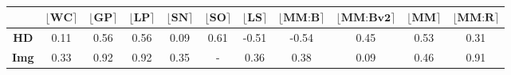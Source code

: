 \documentclass[final]{beamer}
\newlength{\colwidth}
\begin{document}
\begin{frame}[t]
\begin{columns}[t]
\begin{column}{\colwidth}
\begin{block}{\noindent{}}
\begin{table} 
\begin{subtable}{\linewidth}
\begin{tabular}{|c|c|c|c|c|c|c|c|c|c|c|}
\hline
 &                   $\lfloor \textbf{WC}\rceil$ &                  $\lfloor \textbf{GP}\rceil$ &                  $\lfloor \textbf{LP}\rceil$ &              $\lfloor \textbf{SN}\rceil$  & $\lfloor \textbf{SO}\rceil$  & $\lfloor \textbf{LS}\rceil$ & $\lfloor \textbf{MM:B}\rceil$ &  $\lfloor \textbf{MM:Bv2}\rceil$ & $\lfloor \textbf{MM}\rceil$ & $\lfloor \textbf{MM:R}\rceil$      \\ \hline
\bf{HD} &\color{red}0.11 & \color{LimeGreen}0.56 &\color{LimeGreen}0.56 & \color{red}0.09 & \color{LimeGreen}0.61 & \color{red}-0.51 & \color{red}-0.54 & \color{orange}0.45& \color{LimeGreen}0.53& \color{orange}0.31  \\ \hline
 \bf{Img} &\color{orange}0.33 & \color{ForestGreen}0.92 &\color{ForestGreen}0.92 & \color{orange}0.35 &  - & \color{orange}0.36 & \color{orange}0.38 & \color{red}0.09& \color{orange}0.46& \color{ForestGreen}0.91  \\ \hline
\end{tabular}
 \caption{}
\end{subtable}


\end{table}
\end{block}
\end{column}
\end{columns}
\end{frame}
\end{document}
